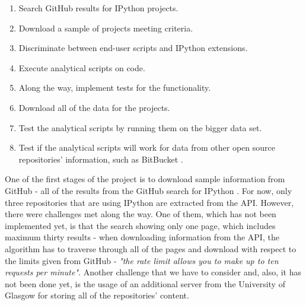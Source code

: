 \begin{enumerate}
\item Search GitHub results for IPython projects.
\item Download a sample of projects meeting criteria.
\item Discriminate between end-user scripts and IPython extensions.
\item Execute analytical scripts on code.
\item Along the way, implement tests for the functionality.
\item Download all of the data for the projects.
\item Test the analytical scripts by running them on the bigger data set.
\item Test if the analytical scripts will work for data from other open source repositories' information, such as BitBucket \cite{bitBucket}.
\end{enumerate}

One of the first stages of the project is to download sample information from GitHub - all of the results from the GitHub search for IPython \cite{gitHubAPI}. For now, only three repositories that are using IPython are extracted from the API. However, there were challenges met along the way. One of them, which has not been implemented yet, is that the search showing only one page, which includes maximum thirty results - when downloading information from the API, the algorithm has to traverse through all of the pages and download with respect to the limits given from GitHub - \textit{"the rate limit allows you to make up to ten requests per minute"}\cite{traverseGitHub}. Another challenge that we have to consider and, also, it has not been done yet, is the usage of an additional server from the University of Glasgow for storing all of the repositories' content. 

